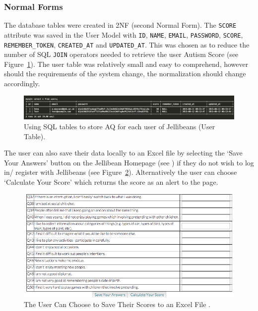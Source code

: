 \documentclass[a4paper, 11pt]{article}
\begin{document}
\subsubsection{Normal Forms}
The database tables were created in 2NF (second Normal Form). The \texttt{SCORE} attribute was saved in the User Model with \texttt{ID}, \texttt{NAME}, \texttt{EMAIL}, \texttt{PASSWORD}, \texttt{SCORE}, \texttt{REMEMBER\_TOKEN}, \texttt{CREATED\_AT} and \texttt{UPDATED\_AT}. This was chosen as to reduce the number of SQL \texttt{JOIN} operators needed to retrieve the user Autism Score (see Figure~\ref{usertable1}). The user table was relatively small and easy to comprehend, however should the requirements of the system change, the normalization should change accordingly.

\begin{figure}[H]
\begin{center}
\includegraphics[scale=0.40]{usertable1}
\caption{Using SQL tables to store AQ for each user of Jellibeans (User Table).}
\label{usertable1}
\end{center}
\end{figure}

The user can also save their data locally to an Excel file by selecting the `Save Your Answers' button on the Jellibean Homepage (see \cite{filhidtable}) if they do not wish to log in/ register with Jellibeans (see Figure~\ref{saveScores}). Alternatively the user can choose `Calculate Your Score' which returns the score as an alert to the page.


\begin{figure}[H]
\begin{center}
\includegraphics[scale=0.5]{saveScores}
\caption{The User Can Choose to Save Their Scores to an Excel File \cite{filhidtable}.}
\label{saveScores}
\end{center}
\end{figure}
\end{document}
